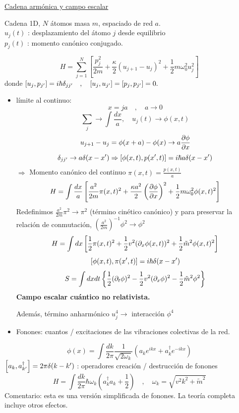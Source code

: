 \vspace{0.5cm}
\noindent \underline{Cadena armónica y campo escalar}

\noindent Cadena 1D, $N$ átomos masa $m$, espaciado de red $a$.\\
$u_j(t)$ : desplazamiento del átomo $j$ desde equilibrio \\
$p_j(t)$ : momento canónico conjugado.

$$ H = \sum_{j=1}^N \left[ \frac{p_j^2}{2m} + \frac{\kappa}{2} (u_{j+1} - u_j)^2 + \frac{1}{2} m \omega_0^2 u_j^2 \right] $$
donde $\comm{u_j}{p_{j'}} = i\hbar \delta_{jj'} \quad , \quad \comm{u_j}{u_{j'}} = \comm{p_j}{p_{j'}} = 0.$

\begin{itemize}
    \item límite al continuo:
          $$x = ja \quad , \quad a \rightarrow 0$$
          $$\sum_j \to \int \frac{dx}{a},\quad u_j(t) \rightarrow \phi(x,t)$$
          $$ u_{j+1} - u_j = \phi(x+a) - \phi(x) \rightarrow a \pdv{\phi}{x} $$
          $$ \delta_{jj'} \rightarrow a \delta(x-x') \Rightarrow \comm{\phi(x,t)}{p(x',t)} = i\hbar a \delta(x-x') $$
          $\Rightarrow$ Momento canónico del continuo $\pi(x,t) = \frac{p(x,t)}{a}$
          $$ H = \int \frac{dx}{a} \left[ \frac{a^2}{2m} \pi(x,t)^2 + \frac{\kappa a^2}{2} \left( \pdv{\phi}{x}(x,t) \right)^2 + \frac{1}{2} m \omega_0^2 \phi(x,t)^2 \right] $$
          Redefinimos $\frac{a^2} {2m} \pi ^2\to \pi^2$ (término cinético canónico) y para preservar la relación de conmutación, $\left( \frac{a^2}{2m}\right)^{-1}\phi^2\to \phi^2$
          $$ H = \int dx \left[ \frac{1}{2} \pi(x,t)^2 + \frac{1}{2} v^2 (\partial_x \phi(x,t))^2 + \frac{1}{2} \tilde{m}^2 \phi(x,t)^2 \right] $$
          $$ \comm{\phi(x,t)}{\pi(x',t)} = i\hbar \delta(x-x') $$
          $$ S = \int dx dt \left\{ \frac{1}{2} (\partial_t \phi)^2 - \frac{1}{2} v^2 (\partial_x \phi)^2 - \frac{1}{2} \tilde{m}^2 \phi^2 \right\} $$
          \textbf{Campo escalar cuántico no relativista.}

          Además, término anharmónico $u_j^4 \rightarrow$ interacción $\phi^4$
    \item Fonones: cuantos / excitaciones de las vibraciones colectivas de la red.
\end{itemize}

$$ \phi(x) = \int \frac{dk}{2\pi} \frac{1}{\sqrt{2\omega_k}} (a_k e^{ikx} + a_k^\dagger e^{-ikx}) $$
$\comm{a_k}{a_{k'}^\dagger} = {2\pi \delta(k-k')}$ : operadores creación / destrucción de fonones
$$ H = \int \frac{dk}{2\pi} \hbar \omega_k \left( a_k^\dagger a_k + \frac{1}{2} \right) \quad , \quad \omega_k = \sqrt{v^2 k^2 + \tilde{m}^2} $$
Comentario: esta es una versión simplificada de fonones. La teoría completa incluye otros efectos.

